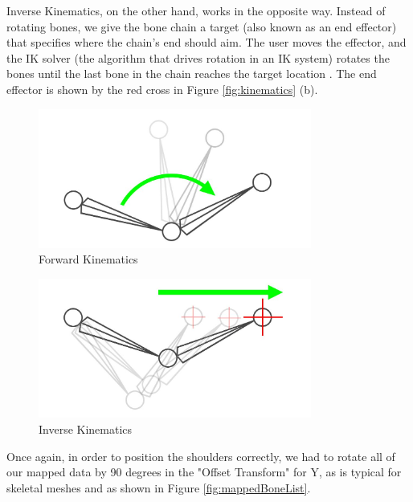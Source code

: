 Inverse Kinematics, on the other hand, works in the opposite way. Instead of rotating bones, we give the bone chain a target (also known as an end effector) that specifies where the chain's end should aim. The user moves the effector, and the IK solver (the algorithm that drives rotation in an IK system) rotates the bones until the last bone in the chain reaches the target location \cite{IK}. The end effector is shown by the red cross in Figure \ref{fig:kinematics} (b).

\begin{table}[!htb]
    \begin{minipage}{\linewidth}
        \centering
        \begin{subfigure}{0.49\textwidth}
            \centering
            \includegraphics[width=0.8\textwidth]{figures/diagram_FK.png}
            \caption{Forward Kinematics \cite{IK}}
        \end{subfigure}
        \begin{subfigure}{0.49\textwidth}
            \includegraphics[width=0.8\textwidth]{figures/diagramIK.png}
            \centering
            \caption{Inverse Kinematics \cite{IK}}
        \end{subfigure}
        \label{fig:kinematics}
	\end{minipage}
\end{table}

Once again, in order to position the shoulders correctly, we had to rotate all of our mapped data by 90 degrees in the "Offset Transform" for Y, as is typical for skeletal meshes and as shown in Figure \ref{fig:mappedBoneList}.

